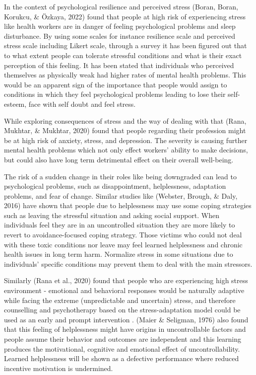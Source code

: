 \documentclass[
11pt, %
oneside, %
english, %
singlespacing, %
]{macthesis} %
\begin{document}
In the context of psychological resilience and perceived stress (Boran, Boran, Korukcu, \& Özkaya, 2022) found that people at high risk of experiencing stress like health workers are in danger of feeling psychological problems and sleep disturbance. By using some scales for instance resilience scale and perceived stress scale including Likert scale, through a survey it has been figured out that to what extent people can tolerate stressful conditions and what is their exact perception of this feeling. It has been stated that individuals who perceived themselves as physically weak had higher rates of mental health problems. This would be an apparent sign of the importance that people would assign to conditions in which they feel psychological problems leading to lose their self-esteem, face with self doubt and feel stress.

While exploring consequences of stress and the way of dealing with that (Rana, Mukhtar, \& Mukhtar, 2020) found that people regarding their profession might be at high risk of anxiety, stress, and depression. The severity is causing further mental health problems which not only effect workers' ability to make decisions, but could also have long term detrimental effect on their overall well-being.

The risk of a sudden change in their roles like being downgraded can lead to psychological problems, such as disappointment, helplessness, adaptation problems, and fear of change. Similar studies like (Webster, Brough, \& Daly, 2016) have shown that people due to helplessness may use some coping strategies such as leaving the stressful situation and asking social support. When individuals feel they are in an uncontrolled situation they are more likely to revert to avoidance-focused coping strategy. Those victims who could not deal with these toxic conditions nor leave may feel learned helplessness and chronic health issues in long term harm. Normalize stress in some situations due to individuals' specific conditions may prevent them to deal with the main stressors.

Similarly (Rana et al., 2020) found that people who are experiencing high stress environment - emotional and behavioral responses would be naturally adaptive while facing the extreme (unpredictable and uncertain) stress, and therefore counselling and psychotherapy based on the stress-adaptation model could be used as an early and prompt intervention . (Maier \& Seligman, 1976) also found that this feeling of helplessness might have origins in uncontrollable factors and people assume their behavior and outcomes are independent and this learning produces the motivational, cognitive and emotional effect of uncontrollability. Learned helplessness will be shown as a defective performance where reduced incentive motivation is undermined.
\end{document}

